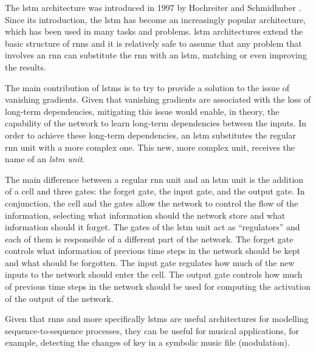 

The \gls{lstm} architecture was introduced in 1997 by
Hochreiter and Schmidhuber \parencite{hochreiter1997long}.
Since its introduction, the \gls{lstm} has become an increasingly
popular architecture, which has been used in many tasks and
problems. \gls{lstm} architectures extend the basic structure of
\glspl{rnn} and it is relatively safe to assume that any
problem that involves an \gls{rnn} can substitute the
\gls{rnn} with an \gls{lstm}, matching or even improving the
results.

The main contribution of \glspl{lstm} is to try to provide a
solution to the issue of vanishing gradients. Given that
vanishing gradients are associated with the loss of
long-term dependencies, mitigating this issue would enable,
in theory, the capability of the network to learn long-term
dependencies between the inputs. In order to achieve these
long-term dependencies, an \gls{lstm} substitutes the regular
\gls{rnn} unit with a more complex one. This new, more
complex unit, receives the name of an \emph{\gls{lstm} unit}.

The main difference between a regular \gls{rnn} unit and an
\gls{lstm} unit is the addition of a cell and three gates: the
forget gate, the input gate, and the output gate. In
conjunction, the cell and the gates allow the network to
control the flow of the information, selecting what
information should the network store and what information
should it forget. The gates of the \gls{lstm} unit act as
``regulators'' and each of them is responsible of a
different part of the network. The forget gate controls what
information of previous time steps in the network should be
kept and what should be forgotten. The input gate regulates
how much of the new inputs to the network should enter the
cell. The output gate controls how much of previous time
steps in the network should be used for computing the
activation of the output of the network.

Given that \glspl{rnn} and more specifically \glspl{lstm}
are useful architectures for modelling sequence-to-sequence
processes, they can be useful for musical applications, for
example, detecting the changes of key in a symbolic music
file (modulation).


